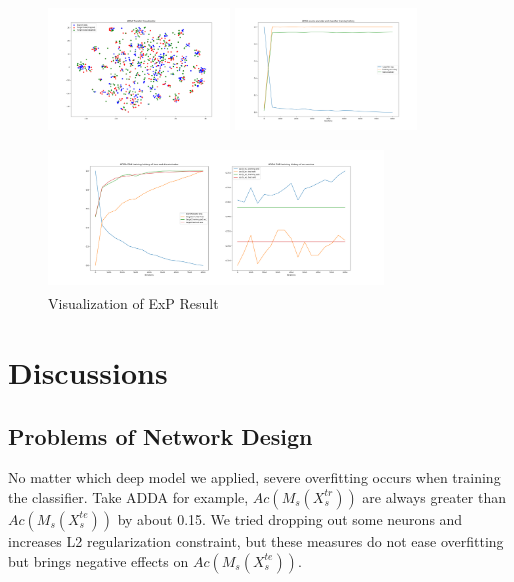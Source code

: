 \documentclass[conference]{IEEEtran}
\begin{document}
\begin{figure}[htb]
\label{fig:ExP}
\centering
\begin{minipage}[t]{0.3\textwidth}
\includegraphics[width=1.9in, height=1.5in]{Ladda/std_P2R/ADDA_visual.png}
\end{minipage}%
\begin{minipage}[t]{0.3\textwidth}
\includegraphics[width=1.9in, height=1.5in]{Ladda/std_P2R/clf.png}
\end{minipage}%
\begin{minipage}[t]{0.45\textwidth}
\includegraphics[width=3.5in, height=1.5in]{Ladda/std_P2R/gan.png}
\end{minipage}%
\caption{Visualization of ExP Result}
\end{figure}



\section{Discussions}
\subsection{Problems of Network Design}
No matter which deep model we applied, severe overfitting occurs when training the classifier. Take ADDA for example, $Ac(M_s(X^{tr}_s))$ are always greater than $Ac(M_s(X^{te}_s))$ by about 0.15. We tried dropping out some neurons and increases L2 regularization constraint, but these measures do not ease overfitting but brings negative effects on $Ac(M_s(X^{te}_s))$.
\end{document}
